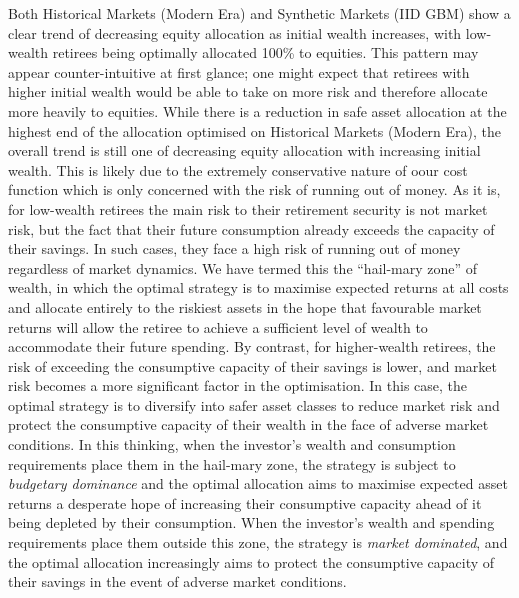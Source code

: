 \documentclass[11pt]{article}
\begin{document}
Both Historical Markets (Modern Era) and Synthetic Markets (IID GBM) show a clear trend of decreasing equity allocation as initial wealth increases, with low-wealth retirees being optimally allocated 100\% to equities. This pattern may appear counter-intuitive at first glance; one might expect that retirees with higher initial wealth would be able to take on more risk and therefore allocate more heavily to equities. While there is a reduction in safe asset allocation at the highest end of the allocation optimised on Historical Markets (Modern Era), the overall trend is still one of decreasing equity allocation with increasing initial wealth. This is likely due to the extremely conservative nature of oour cost function which is only concerned with the risk of running out of money. As it is, for low-wealth retirees the main risk to their retirement security is not market risk, but the fact that their future consumption already exceeds the capacity of their savings. In such cases, they face a high risk of running out of money regardless of market dynamics. We have termed this the ``hail-mary zone'' of wealth, in which the optimal strategy is to maximise expected returns at all costs and allocate entirely to the riskiest assets in the hope that favourable market returns will allow the retiree to achieve a sufficient level of wealth to accommodate their future spending. By contrast, for higher-wealth retirees, the risk of exceeding the consumptive capacity of their savings is lower, and market risk becomes a more significant factor in the optimisation. In this case, the optimal strategy is to diversify into safer asset classes to reduce market risk and protect the consumptive capacity of their wealth in the face of adverse market conditions. In this thinking, when the investor's wealth and consumption requirements place them in the hail-mary zone, the strategy is subject to \textit{budgetary dominance} and the optimal allocation aims to maximise expected asset returns a desperate hope of increasing their consumptive capacity ahead of it being depleted by their consumption. When the investor's wealth and spending requirements place them outside this zone, the strategy is \textit{market dominated}, and the optimal allocation increasingly aims to protect the consumptive capacity of their savings in the event of adverse market conditions.
\end{document}
